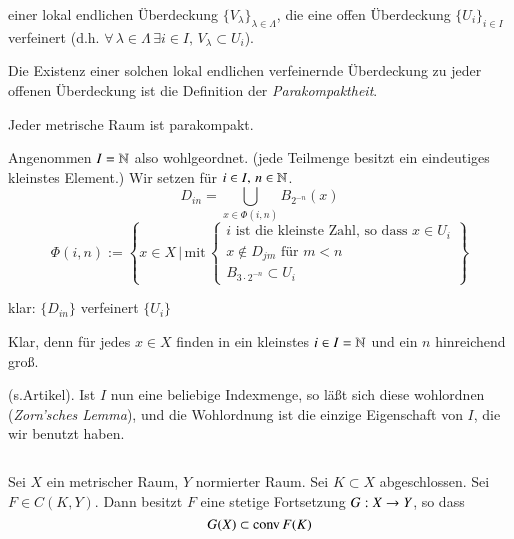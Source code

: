 \begin{description}
\begin{itemize}
        \end{itemize}
        \item[„Konstruktion“] einer lokal endlichen Überdeckung $\{V_\lambda\}_{\lambda\in\Lambda}$, die
        eine offen Überdeckung $\{U_i\}_{i\in I}$ verfeinert (d.h. $\forall \, \lambda\in \Lambda \, 
        \exists i \in I, \, V_\lambda\subset U_i$).
        \item{Die Existenz} einer solchen lokal endlichen verfeinernde Überdeckung zu jeder offenen
        Überdeckung ist die Definition der \textit{Parakompaktheit}.
        \begin{theorem}\label{2.11}
                    Jeder metrische Raum ist parakompakt.
        \end{theorem}

        \begin{idea}
        Angenommen $I=\mathbb{N}$ also wohlgeordnet. (jede Teilmenge besitzt ein eindeutiges kleinstes Element.)
        Wir setzen für $i\in I, \, n\in \mathbb{N}$.
        \[
            D_{in}=\bigcup_{x\in \Phi(i,n)} B_{2^{-n}}(x)
        \]
        \[
            \Phi(i,n):=\left\{x\in X \, \Big| \, \text{mit}\, \begin{cases}\text{$i$ ist die kleinste
            Zahl, so dass $x\in U_i$}\\ \text{$x\nin D_{jm}$ für $m<n$}\\ B_{3\cdot2^{-n}}\subset U_i  
            \end{cases}\right\}
        \]
        \begin{description}
        \item klar: $\{ D_{in} \}$ verfeinert $\{U_i\}$
        \item[Überdeckung:] Klar, denn für jedes $x\in X$ finden in ein kleinstes $i\in I=\mathbb{N}$ und ein
        $n$ hinreichend groß.
        \item[lokale Endlichkeit:] (s.Artikel).
        Ist $I$ nun eine beliebige Indexmenge, so läßt sich diese wohlordnen (\textit{Zorn'sches Lemma}),
        und die Wohlordnung ist die einzige Eigenschaft von $I$, die wir benutzt haben.
        \end{description}
        \[ \]
        \end{idea}
    \end{description}
\begin{theorem}\label{2.12}
    Sei $X$ ein metrischer Raum, $Y$ normierter Raum. Sei $K\subset X$ abgeschlossen. Sei $F\in C(K,Y)$.
    Dann besitzt $F$ eine stetige Fortsetzung $G:X\rightarrow Y$, so dass
    \[
        G(X)\subset\mathrm{conv}\, F(K)
    \]
\end{theorem}

